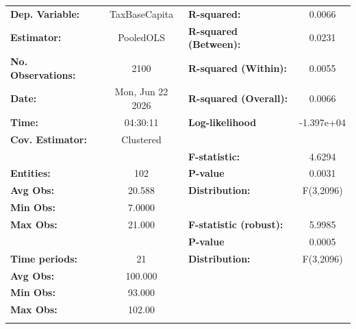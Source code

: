 \begin{center}
\begin{tabular}{lclc}
\toprule
\textbf{Dep. Variable:}          &   TaxBaseCapita    & \textbf{  R-squared:         }   &      0.0066      \\
\textbf{Estimator:}              &     PooledOLS      & \textbf{  R-squared (Between):}  &      0.0231      \\
\textbf{No. Observations:}       &        2100        & \textbf{  R-squared (Within):}   &      0.0055      \\
\textbf{Date:}                   &  Mon, Jun 22 2026  & \textbf{  R-squared (Overall):}  &      0.0066      \\
\textbf{Time:}                   &      04:30:11      & \textbf{  Log-likelihood     }   &    -1.397e+04    \\
\textbf{Cov. Estimator:}         &     Clustered      & \textbf{                     }   &                  \\
\textbf{}                        &                    & \textbf{  F-statistic:       }   &      4.6294      \\
\textbf{Entities:}               &        102         & \textbf{  P-value            }   &      0.0031      \\
\textbf{Avg Obs:}                &       20.588       & \textbf{  Distribution:      }   &    F(3,2096)     \\
\textbf{Min Obs:}                &       7.0000       & \textbf{                     }   &                  \\
\textbf{Max Obs:}                &       21.000       & \textbf{  F-statistic (robust):} &      5.9985      \\
\textbf{}                        &                    & \textbf{  P-value            }   &      0.0005      \\
\textbf{Time periods:}           &         21         & \textbf{  Distribution:      }   &    F(3,2096)     \\
\textbf{Avg Obs:}                &      100.000       & \textbf{                     }   &                  \\
\textbf{Min Obs:}                &       93.000       & \textbf{                     }   &                  \\
\textbf{Max Obs:}                &       102.00       & \textbf{                     }   &                  \\
\textbf{}                        &                    & \textbf{                     }   &                  \\

\end{tabular}
\end{center}
